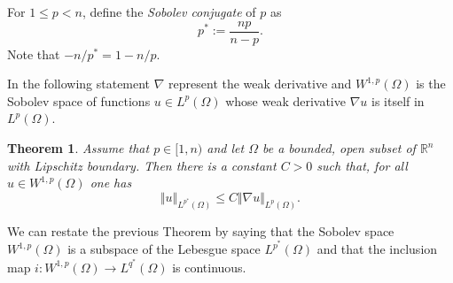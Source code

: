 \documentclass[12pt]{article}
\newtheorem{theorem}{Theorem}
\newcommand{\R}{\mathbb R}
\begin{document}
For $1\le p < n$, define the \emph{Sobolev conjugate } of $p$ as
\[
  p^* := \frac {np}{n-p}.
\]
Note that $-n/p^* = 1-n/p$.

In the following statement $\nabla$ represent the weak derivative and $W^{1,p}(\Omega)$ 
is the Sobolev space of functions $u\in L^p(\Omega)$ whose weak derivative $\nabla u$ is itself in $L^p(\Omega)$.

\begin{theorem}
Assume that $p\in [1,n)$ and let $\Omega$ be a bounded, open subset of $\R^n$
with Lipschitz boundary. 
Then there is a constant $C>0$ such that, for all $u\in W^{1,p}(\Omega)$ one has
\[
 \Vert u \Vert_{L^{p^*}(\Omega)} \le C \Vert \nabla u \Vert_{L^p(\Omega)}.
\]
\end{theorem}

We can restate the previous Theorem by saying that the Sobolev space $W^{1,p}(\Omega)$ is a subspace of the Lebesgue space $L^{p^*}(\Omega)$ and that the inclusion map $i\colon W^{1,p}(\Omega)\to L^{q^*}(\Omega)$ is continuous.
\end{document}
